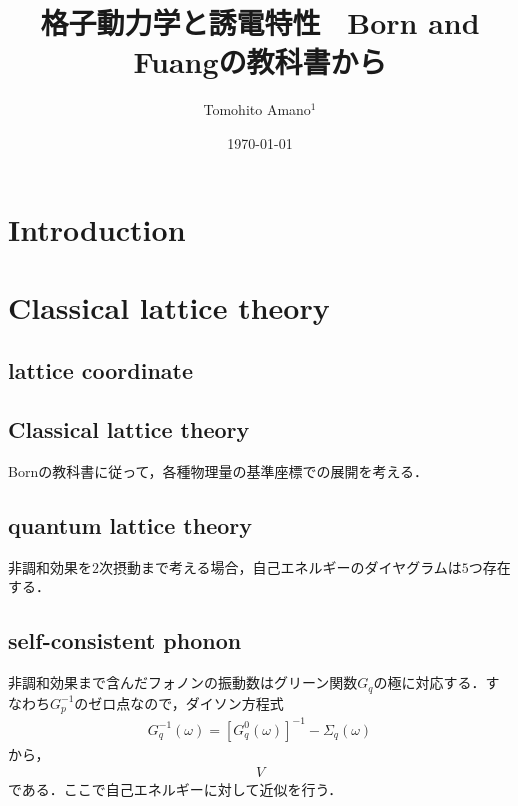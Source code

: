 \documentclass[twocolumn,showpacs,prb,amsfonts,amsmath,amssymb,floatfix,groupedaddress]{ltjsarticle} %
\begin{document}
\title{格子動力学と誘電特性~ Born and Fuangの教科書から}
\author{Tomohito Amano$^{1}$}

\date{\today}

\maketitle


\section{Introduction}


\section{Classical lattice theory}

\subsection{lattice coordinate}


\subsection{Classical lattice theory}
Bornの教科書に従って，各種物理量の基準座標での展開を考える．


\subsection{quantum lattice theory}
非調和効果を$2$次摂動まで考える場合，自己エネルギーのダイヤグラムは$5$つ存在する．


\subsection{self-consistent phonon}
非調和効果まで含んだフォノンの振動数はグリーン関数$G_q$の極に対応する．すなわち$G_p^{-1}$のゼロ点なので，ダイソン方程式
\begin{align}
 G_q^{-1}(\omega)= \left[ G_q^{0}(\omega)\right]^{-1}-\Sigma_{q}(\omega)
\end{align}
から，
\begin{align}
 V
\end{align}
である．ここで自己エネルギーに対して近似を行う．
\end{document}
